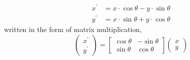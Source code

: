 \documentclass[12pt, a4 paper]{article}
\begin{document}
\begin{align}
    x^{\prime} &= x \cdot \cos\theta - y \cdot \sin\theta\\
    y^{\prime} &= x \cdot \sin\theta + y \cdot \cos\theta
\end{align}
\indent written in the form of matrix multiplication,
\begin{equation}
    \begin{pmatrix} x^{\prime} \\ y^{\prime} \end{pmatrix}=
    \begin{bmatrix} \cos\theta & -\sin\theta
    \\ \sin\theta & \cos\theta \end{bmatrix}
    \begin{pmatrix} x \\ y \end{pmatrix}
\end{equation}
\end{document}
